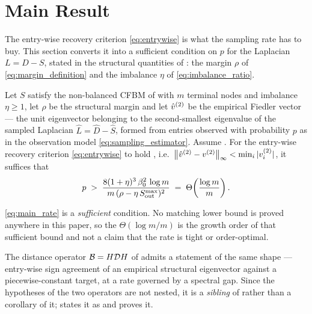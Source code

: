 \section{Main Result}\label{sec:main}
The entry-wise recovery criterion \eqref{eq:entrywise} is what the sampling rate
has to buy. This section converts it into a sufficient condition on $p$ for the
Laplacian $L=D-S$, stated in the structural quantities of : the
margin $\rho$ of \eqref{eq:margin_definition} and the imbalance $\eta$ of
\eqref{eq:imbalance_ratio}.

\begin{theorem}\label{thm:main-sim}
Let $S$ satisfy the non-balanced CFBM of  with $m$ terminal nodes and
imbalance $\eta\ge1$, let $\rho$
be the structural margin and let $\hat v^{(2)}$ be the empirical Fiedler vector --- the
unit eigenvector belonging to the second-smallest eigenvalue of the sampled
Laplacian $\hat L=\hat D-\hat S$, formed from entries observed with probability
$p$ as in the observation model \eqref{eq:sampling_estimator}. Assume
. For the entry-wise recovery criterion
\eqref{eq:entrywise} to hold \hp, i.e.\
$\left\lVert \hat v^{(2)}-v^{(2)} \right\rVert_\infty<\min_i|v^{(2)}_i|$, it suffices that
\begin{equation}\label{eq:main_rate}
   p\;>\;\frac{8(1+\eta)^3\,\beta_0^2\,\log m}{m\,(\rho-\eta\,S_{\mathrm{out}}^{\max})^2}
       \;=\;\Theta\!\left(\frac{\log m}{m}\right).
\end{equation}
\end{theorem}

\noindent \eqref{eq:main_rate} is a \emph{sufficient} condition. No matching lower
bound is proved anywhere in this paper, so the $\Theta(\log m/m)$ is the growth
order of that sufficient bound and not a claim that the rate is tight or
order-optimal.

\noindent The distance operator $\mathcal{B}=H\mathcal{D} H$ of  admits a
statement of the same shape --- entry-wise sign agreement of an empirical
structural eigenvector against a piecewise-constant target, at a rate governed by
a spectral gap. Since the hypotheses of the two operators are not nested, it is a
\emph{sibling} of \Cref{thm:main-sim} rather than a corollary of it;
\Cref{app:dist} states it as \Cref{thm:main-dist} and proves it.
